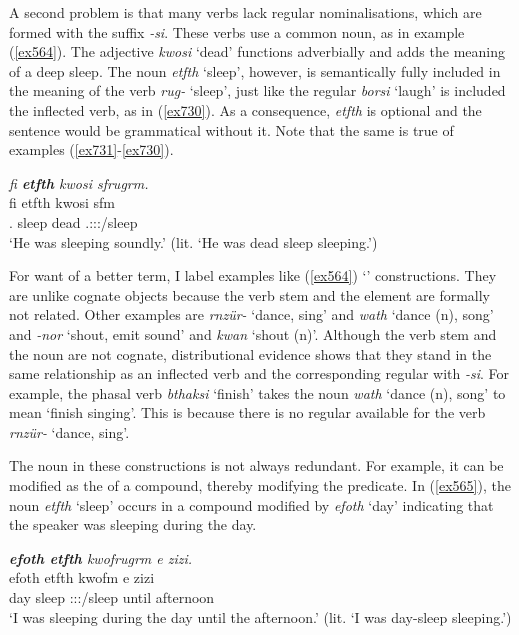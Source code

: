 A second problem is that many verbs lack regular nominalisations, which are formed with the suffix \emph{-si}. These verbs use a common noun, as in example (\ref{ex564}). The adjective \emph{kwosi} `dead' functions adverbially and adds the meaning of a deep sleep. The noun \emph{etfth} `sleep', however, is semantically fully included in the meaning of the verb \emph{rug-} `sleep', just like the regular  \emph{borsi} `laugh' is included the inflected verb, as in (\ref{ex730}). As a consequence, \emph{etfth} is optional and the sentence would be grammatical without it. Note that the same is true of examples (\ref{ex731}-\ref{ex730}).

\begin{exe}
	\ex \emph{fi \textbf{etfth} kwosi sfrugrm.}\\
	\gll fi etfth kwosi sfm\\
	\Third.{\Abs} sleep dead \Tsg.\Masc:\Sbj:\Pst:\Dur/sleep\\
	\trans `He was sleeping soundly.' (lit. `He was dead sleep sleeping.')\\
	\label{ex564}
\end{exe}

For want of a better term, I label examples like (\ref{ex564}) `' constructions. They are unlike cognate objects because the verb stem and the  element are formally not related. Other examples are \emph{rnzür-} `dance, sing' and \emph{wath} `dance (n), song' and \emph{-nor} `shout, emit sound' and \emph{kwan} `shout (n)'. Although the verb stem and the noun are not cognate, distributional evidence shows that they stand in the same relationship as an inflected verb and the corresponding regular  with \emph{-si}. For example, the phasal verb \emph{bthaksi} `finish' takes the noun \emph{wath} `dance (n), song' to mean `finish singing'. This is because there is no regular  available for the verb \emph{rnzür-} `dance, sing'.

The noun in these constructions is not always redundant. For example, it can be modified as the  of a compound, thereby modifying the predicate. In (\ref{ex565}), the noun \emph{etfth} `sleep' occurs in a compound modified by \emph{efoth} `day' indicating that the speaker was sleeping during the day.

\begin{exe}
	\ex \emph{\textbf{efoth etfth} kwofrugrm e zizi.}\\
	\gll efoth etfth kwofm e zizi\\
	day sleep \Fsg:\Sbj:\Pst:\Dur/sleep until afternoon\\
	\trans `I was sleeping during the day until the afternoon.' (lit. `I was day-sleep sleeping.')\\
	\label{ex565}
\end{exe}

